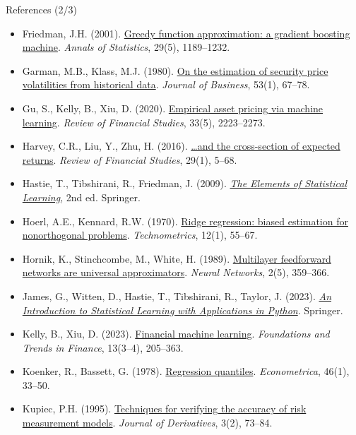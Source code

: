 \begin{frame}{References (2/3)}
\itemsize{\tiny}
\begin{itemize}
    \item Friedman, J.H. (2001). \href{https://doi.org/10.1214/aos/1013203451}{Greedy function approximation: a gradient boosting machine}. \textit{Annals of Statistics}, 29(5), 1189--1232.
    \item Garman, M.B., Klass, M.J. (1980). \href{https://doi.org/10.1086/296072}{On the estimation of security price volatilities from historical data}. \textit{Journal of Business}, 53(1), 67--78.
    \item Gu, S., Kelly, B., Xiu, D. (2020). \href{https://doi.org/10.1093/rfs/hhaa009}{Empirical asset pricing via machine learning}. \textit{Review of Financial Studies}, 33(5), 2223--2273.
    \item Harvey, C.R., Liu, Y., Zhu, H. (2016). \href{https://doi.org/10.1093/rfs/hhv059}{\ldots and the cross-section of expected returns}. \textit{Review of Financial Studies}, 29(1), 5--68.
    \item Hastie, T., Tibshirani, R., Friedman, J. (2009). \href{https://doi.org/10.1007/978-0-387-84858-7}{\textit{The Elements of Statistical Learning}}, 2nd ed. Springer.
    \item Hoerl, A.E., Kennard, R.W. (1970). \href{https://doi.org/10.1080/00401706.1970.10488634}{Ridge regression: biased estimation for nonorthogonal problems}. \textit{Technometrics}, 12(1), 55--67.
    \item Hornik, K., Stinchcombe, M., White, H. (1989). \href{https://doi.org/10.1016/0893-6080(89)90020-8}{Multilayer feedforward networks are universal approximators}. \textit{Neural Networks}, 2(5), 359--366.
    \item James, G., Witten, D., Hastie, T., Tibshirani, R., Taylor, J. (2023). \href{https://doi.org/10.1007/978-3-031-38747-0}{\textit{An Introduction to Statistical Learning with Applications in Python}}. Springer.
    \item Kelly, B., Xiu, D. (2023). \href{https://doi.org/10.1561/0500000064}{Financial machine learning}. \textit{Foundations and Trends in Finance}, 13(3--4), 205--363.
    \item Koenker, R., Bassett, G. (1978). \href{https://doi.org/10.2307/1913643}{Regression quantiles}. \textit{Econometrica}, 46(1), 33--50.
    \item Kupiec, P.H. (1995). \href{https://doi.org/10.3905/jod.1995.407942}{Techniques for verifying the accuracy of risk measurement models}. \textit{Journal of Derivatives}, 3(2), 73--84.
\end{itemize}
\end{frame}


